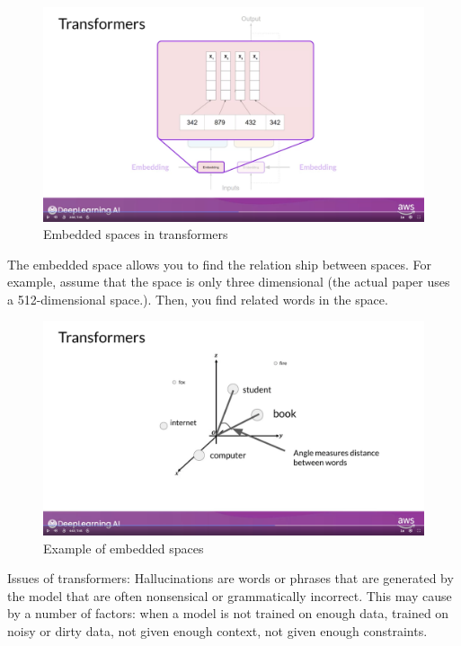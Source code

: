 \documentclass[12pt]{report}
\begin{document}
\begin{figure}[H]
  \centering
  \caption{Embedded spaces in transformers}
  \includegraphics[scale=0.2]{pics/embeddedSpace.png}
\end{figure}

The embedded space allows you to find the relation ship between spaces. For example, assume that the space is only three dimensional (the actual paper uses a 512-dimensional space.). Then, you find related words in the space.


\begin{figure}[H]
  \centering
  \caption{Example of embedded spaces}
  \includegraphics[scale=0.2]{pics/exEmbedSpace.png}
\end{figure}




Issues of transformers: Hallucinations are words or phrases that are generated by the model that are often nonsensical or grammatically incorrect. This may cause by a number of factors: when a model is not trained on enough data, trained on noisy or dirty data, not given enough context, not given enough constraints.
\end{document}
